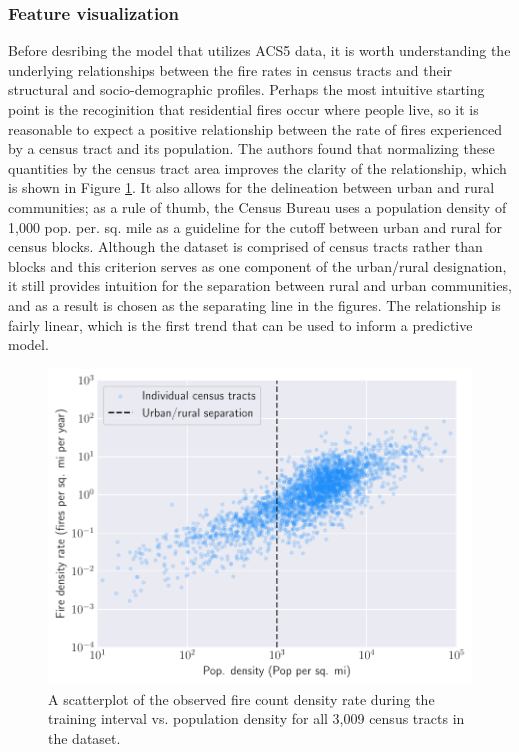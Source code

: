 \documentclass{svjour3}
\begin{document}
  \subsubsection{Feature visualization}
  Before desribing the model that utilizes ACS5 data, it is worth understanding the underlying relationships between the fire rates in census tracts and their structural and socio-demographic profiles. Perhaps the most intuitive starting point is the recoginition that residential fires occur where people live, so it is reasonable to expect a positive relationship between the rate of fires experienced by a census tract and its population. The authors found that normalizing these quantities by the census tract area improves the clarity of the relationship, which is shown in Figure \ref{fig:pop_relation}. It also allows for the delineation between urban and rural communities; as a rule of thumb, the Census Bureau   \cite{ratcliffe2016defining} uses a population density of 1,000 pop. per. sq. mile as a guideline for the cutoff between urban and rural for census blocks. Although the dataset is comprised of census tracts rather than blocks and this criterion serves as one component of the urban/rural designation, it still provides intuition for the separation between rural and urban communities, and as a result is chosen as the separating line in the figures. The relationship is fairly linear, which is the first trend that can be used to inform a predictive model.
    
     \begin{figure}[htb] \centering
    \includegraphics[width=.75\textwidth]{figures/pop_relation.pdf}
    \caption{A scatterplot of the observed fire count density rate   during the training interval vs. population density for all 3,009 census tracts in the dataset. }
    \label{fig:pop_relation}
    \end{figure}
  
\end{document}
